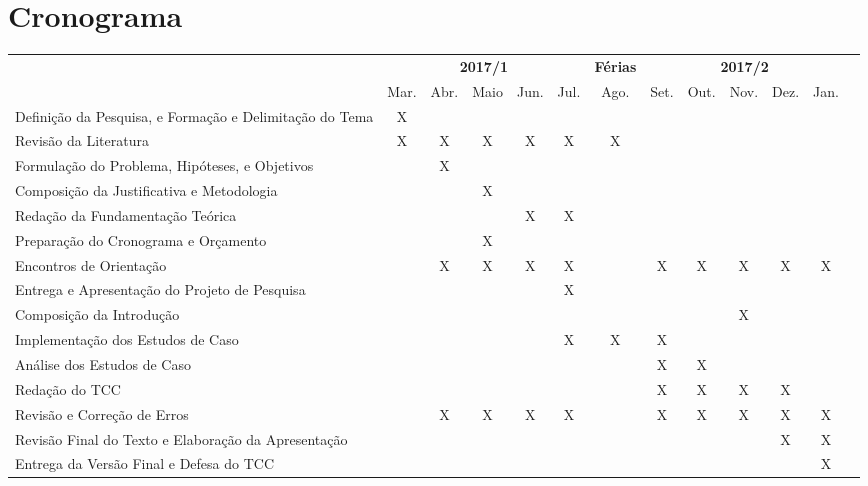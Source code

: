 \section{Cronograma}
\label{sec:cronograma}

\begin{adjustbox}{center}
  \tiny
  \begin{tabular}{|p{4cm}|c|c|c|c|c|c|c|c|c|c|c|l|}
    \cline{1-12}
      \multicolumn{1}{|c|}{
        \multirow{2}{*}{
          \diagbox[width=4.4cm]{
            \textbf{Atividades}
          }{
            \textbf{Ano/Mês}
          }}}
      & \multicolumn{5}{c|}{\textbf{2017/1}}
      & \multicolumn{1}{c|}{\textbf{Férias}}
      & \multicolumn{5}{c|}{\textbf{2017/2}} \\
      \cline{2-12}
      & Mar. & Abr. & Maio & Jun. & Jul. & Ago. & Set. & Out. & Nov. & Dez. & Jan. \\
    \hline
      Definição da Pesquisa, e Formação e Delimitação do Tema
      & X &  &  &  &  &  &  &  &  &  &  \\
    \hline
      Revisão da Literatura
      & X & X & X & X & X & X & & &  &  &  \\
    \hline
      Formulação do Problema, Hipóteses, e Objetivos
      & & X & & &  &  &  &  &  &  &  \\
    \hline
      Composição da Justificativa e Metodologia
      & & & X & & & & & & & & \\
    \hline
      Redação da Fundamentação Teórica
      & & & & X & X & & & & & & \\
    \hline
      Preparação do Cronograma e Orçamento
      & & & X & & & & & & & & \\
    \hline
      Encontros de Orientação
      & & X & X & X & X & & X & X & X & X & X \\
    \hline
      Entrega e Apresentação do Projeto de Pesquisa
      & & & & & X & & & & & & \\
    \hline
      Composição da Introdução
      & & & & & & & & & X & & \\
    \hline
      Implementação dos Estudos de Caso
      & & & & & X & X & X & & & & \\
    \hline
      Análise dos Estudos de Caso
      & & & & & & & X & X & & & \\
    \hline
      Redação do TCC
      & & & & & & & X & X & X & X & \\
    \hline
      Revisão e Correção de Erros
      & & X & X & X & X & & X & X & X & X & X \\
    \hline
      Revisão Final do Texto e Elaboração da Apresentação
      & & & & & & & & & & X & X \\
    \hline
      Entrega da Versão Final e Defesa do TCC
      & & & & & & & & & & & X \\
    \hline
  \end{tabular}
\end{adjustbox}

